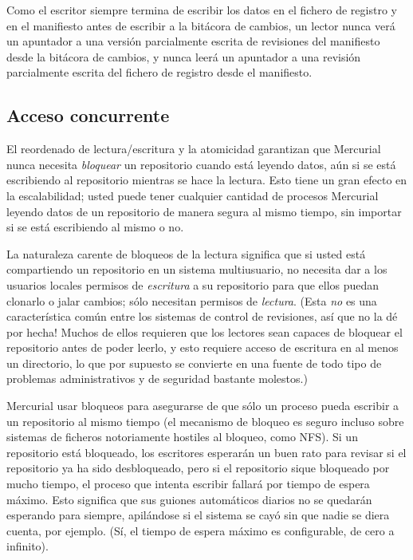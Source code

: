Como el escritor siempre termina de escribir los datos en el fichero
de registro y en el manifiesto antes de escribir a la bitácora de
cambios, un lector nunca verá un apuntador a una versión parcialmente
escrita de revisiones del manifiesto desde la bitácora de cambios, y
nunca leerá un apuntador a una revisión parcialmente escrita del
fichero de registro desde el manifiesto.

\subsection{Acceso concurrente}

El reordenado de lectura/escritura y la atomicidad garantizan que
Mercurial nunca necesita \emph{bloquear} un repositorio cuando está
leyendo datos, aún si se está escribiendo al repositorio mientras se
hace la lectura. Esto tiene un gran efecto en la escalabilidad; usted
puede tener cualquier cantidad de procesos Mercurial leyendo datos de
un repositorio de manera segura al mismo tiempo, sin importar si se
está escribiendo al mismo o no.

La naturaleza carente de bloqueos de la lectura significa que si usted
está compartiendo un repositorio en un sistema multiusuario, no
necesita dar a los usuarios locales permisos de \emph{escritura} a su
repositorio para que ellos puedan clonarlo o jalar cambios; sólo
necesitan permisos de \emph{lectura}. (Esta \emph{no} es una
característica común entre los sistemas de control de revisiones, así
que no la dé por hecha! Muchos de ellos requieren que los lectores
sean capaces de bloquear el repositorio antes de poder leerlo, y esto
requiere acceso de escritura en al menos un directorio, lo que por
supuesto se convierte en una fuente de todo tipo de problemas
administrativos y de seguridad bastante molestos.)

Mercurial usar bloqueos para asegurarse de que sólo un proceso pueda
escribir a un repositorio al mismo tiempo (el mecanismo de bloqueo es
seguro incluso sobre sistemas de ficheros notoriamente hostiles al
bloqueo, como NFS). Si un repositorio está bloqueado, los escritores
esperarán un buen rato para revisar si el repositorio ya ha sido
desbloqueado, pero si el repositorio sique bloqueado por mucho tiempo,
el proceso que intenta escribir fallará por tiempo de espera máximo.
Esto significa que sus guiones automáticos diarios no se quedarán
esperando para siempre, apilándose si el sistema se cayó sin que nadie
se diera cuenta, por ejemplo. (Sí, el tiempo de espera máximo es
configurable, de cero a infinito).


